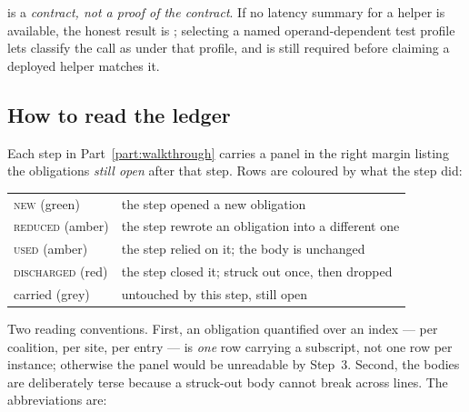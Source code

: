  is a \emph{contract, not a proof of the contract}. If no latency summary
for a helper is available, the honest result is \Unknown{}; selecting a named
operand-dependent test profile lets  classify the call as \Unsafe{} under
that profile, and  is still required before claiming a deployed helper
matches it.

\subsection{How to read the ledger}
\label{sec:ledgerguide}

Each step in Part~\ref{part:walkthrough} carries a panel in the right margin
listing the obligations \emph{still open} after that step. Rows are coloured by
what the step did:

\begin{center}
\begin{tabular}{@{}ll@{}}
\toprule
\textsc{new} (green) & the step opened a new obligation \\
\textsc{reduced} (amber) & the step rewrote an obligation into a different one \\
\textsc{used} (amber) & the step relied on it; the body is unchanged \\
\textsc{discharged} (red) & the step closed it; struck out once, then dropped \\
carried (grey) & untouched by this step, still open \\
\bottomrule
\end{tabular}
\end{center}

Two reading conventions. First, an obligation quantified over an index --- per
coalition, per site, per entry --- is \emph{one} row carrying a subscript, not
one row per instance; otherwise the panel would be unreadable by Step~3.
Second, the bodies are deliberately terse because a struck-out body cannot break
across lines. The abbreviations are:


